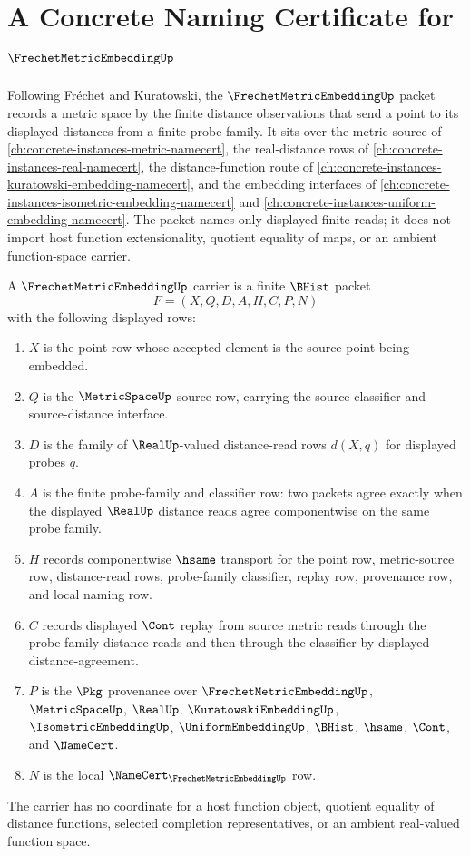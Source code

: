 \chapter{A Concrete Naming Certificate for $\FrechetMetricEmbeddingUp$}
\label{ch:concrete-instances-frechet-metric-embedding-namecert}

Following Fréchet and Kuratowski, the $\FrechetMetricEmbeddingUp$ packet records a metric space by the finite distance observations that send a point to its displayed distances from a finite probe family. It sits over the metric source of \autoref{ch:concrete-instances-metric-namecert}, the real-distance rows of \autoref{ch:concrete-instances-real-namecert}, the distance-function route of \autoref{ch:concrete-instances-kuratowski-embedding-namecert}, and the embedding interfaces of \autoref{ch:concrete-instances-isometric-embedding-namecert} and \autoref{ch:concrete-instances-uniform-embedding-namecert}. The packet names only displayed finite reads; it does not import host function extensionality, quotient equality of maps, or an ambient function-space carrier.

\begin{definition}
\label{def:frechet-metric-embedding-carrier}
A $\FrechetMetricEmbeddingUp$ carrier is a finite $\BHist$ packet
$$
F=(X,Q,D,A,H,C,P,N)
$$
with the following displayed rows:
\begin{enumerate}
\item $X$ is the point row whose accepted element is the source point being embedded.
\item $Q$ is the $\MetricSpaceUp$ source row, carrying the source classifier and source-distance interface.
\item $D$ is the family of $\RealUp$-valued distance-read rows $d(X,q)$ for displayed probes $q$.
\item $A$ is the finite probe-family and classifier row: two packets agree exactly when the displayed $\RealUp$ distance reads agree componentwise on the same probe family.
\item $H$ records componentwise $\hsame$ transport for the point row, metric-source row, distance-read rows, probe-family classifier, replay row, provenance row, and local naming row.
\item $C$ records displayed $\Cont$ replay from source metric reads through the probe-family distance reads and then through the classifier-by-displayed-distance-agreement.
\item $P$ is the $\Pkg$ provenance over $\FrechetMetricEmbeddingUp$, $\MetricSpaceUp$, $\RealUp$, $\KuratowskiEmbeddingUp$, $\IsometricEmbeddingUp$, $\UniformEmbeddingUp$, $\BHist$, $\hsame$, $\Cont$, and $\NameCert$.
\item $N$ is the local $\NameCert_{\FrechetMetricEmbeddingUp}$ row.
\end{enumerate}
The carrier has no coordinate for a host function object, quotient equality of distance functions, selected completion representatives, or an ambient real-valued function space.
\end{definition}

